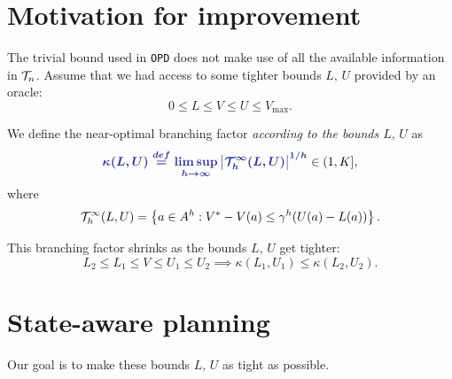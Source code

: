 \documentclass{article}
\begin{document}
\section{Motivation for improvement}

The trivial bound used in \texttt{OPD} does not make use of all the available information in $\mathcal{T}_n$. Assume that we had access to some tighter bounds $L,\,U$ provided by an oracle: $$0\leq L\leq V\leq U\leq V_{\max}.$$

\begin{definition}
We define the near-optimal branching factor \emph{according to the bounds $L,\,U$} as $$\hlbb{\kappa(L,U) \eqdef \limsup_{h\rightarrow\infty} \left|\Tau_h^\infty(L,U)\right|^{1/h}}\in(1, K],$$ where
\begin{equation}
     \mathcal{T}_h^\infty(L,U)=\left\{a\in A^h: V^* - V(a)\leq \gamma^{h}(U(a)-L(a))\right\}.
\end{equation}

\end{definition}

\begin{lemma}This branching factor shrinks as the bounds $L,\,U$ get tighter:
\[L_2\leq L_1\leq V\leq U_1\leq U_2\implies \kappa(L_1,U_1) \leq \kappa(L_2,U_2).\]
\end{lemma}


\noindent{}

\section{State-aware planning}

Our goal is to make these bounds $L,\,U$ as tight as possible. 
\end{document}
